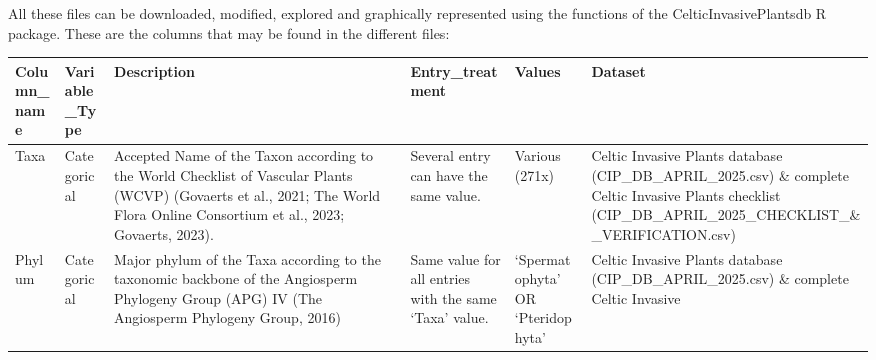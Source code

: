 \documentclass[
]{article}
\begin{document}
All these files can be downloaded, modified, explored and graphically
represented using the functions of the CelticInvasivePlantsdb R package.
These are the columns that may be found in the different files:

\begin{longtable}[]{@{}
  >{\raggedright\arraybackslash}p{}
  >{\raggedright\arraybackslash}p{}
  >{\raggedright\arraybackslash}p{}
  >{\raggedright\arraybackslash}p{}
  >{\raggedright\arraybackslash}p{}
  >{\raggedright\arraybackslash}p{}@{}}
\toprule\noalign{}
\begin{minipage}[b]{\linewidth}\raggedright
Column\_name
\end{minipage} & \begin{minipage}[b]{\linewidth}\raggedright
Variable\_Type
\end{minipage} & \begin{minipage}[b]{\linewidth}\raggedright
Description
\end{minipage} & \begin{minipage}[b]{\linewidth}\raggedright
Entry\_treatment
\end{minipage} & \begin{minipage}[b]{\linewidth}\raggedright
Values
\end{minipage} & \begin{minipage}[b]{\linewidth}\raggedright
Dataset
\end{minipage} \\
\midrule\noalign{}
\endhead
\bottomrule\noalign{}
\endlastfoot
Taxa & Categorical & Accepted Name of the Taxon according to the World
Checklist of Vascular Plants (WCVP) (Govaerts et al., 2021; The World
Flora Online Consortium et al., 2023; Govaerts, 2023). & Several entry
can have the same value. & Various (271x) & Celtic Invasive Plants
database (CIP\_DB\_APRIL\_2025.csv) \& complete Celtic Invasive Plants
checklist (CIP\_DB\_APRIL\_2025\_CHECKLIST\_\&\_VERIFICATION.csv) \\
Phylum & Categorical & Major phylum of the Taxa according to the
taxonomic backbone of the Angiosperm Phylogeny Group (APG) IV (The
Angiosperm Phylogeny Group, 2016) & Same value for all entries with the
same `Taxa' value. & `Spermatophyta' OR `Pteridophyta' & Celtic Invasive
Plants database (CIP\_DB\_APRIL\_2025.csv) \& complete Celtic Invasive

\end{longtable}
\end{document}
